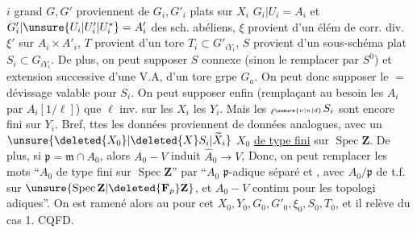  $i$ grand $G,G'$ proviennent de $G_i,G'_i$  plats sur $X_i$
$G_i|U_i=A_i$ et $G'_i|\unsure{U_i|U_i'|U_i^*}=A'_i$ des sch. abéliens,
$\xi$ provient d'un élém de corr. div. $\xi'$ sur $A_i\times A'_i$,
$T$ provient d'un tore $T_i\subset G'_{iY_i}$, $S$ provient d'un sous-schéma plat $S_i\subset G_{iY_i}$.
De plus,   on peut  supposer $S$ connexe  (sinon le remplacer par $S^0$) et
extension  successive d'une V.A, d'un tore     grpe $G_a$.
On peut donc supposer le $=$ dévissage valable pour $S_i$.
On peut supposer enfin (remplaçant au besoin les $A_i$ par  $A_i[1/\ell]$) que $\ell$ inv. sur les $X_i$  les $Y_i$.
Mais les $ {}_{\ell^{\unsure{\nu|n|d}}}S_i$ sont encore fini sur $Y_i$.
Bref, ttes les données proviennent de  données analogues, avec un $\unsure{\deleted{X_0}|\deleted{X}S_i|\widetilde X_i}$
$X_0$  \uline{de type fini} sur $\operatorname{Spec}\mathbf Z$.
De plus, si $\mathfrak p=\mathfrak m\cap A_0$, alors $A_0\mathbin{-}V$ induit $\widehat A_0\longrightarrow V$, 
Donc, on peut remplacer les mots ``$A_0$ de type fini sur $\operatorname{Spec}\mathbf Z$'' par ``$A_0$ $\mathfrak p$-adique séparé et , avec $A_0/\mathfrak p$ de t.f. sur $\unsure{\operatorname{Spec}\mathbf Z|\deleted{\mathbf F_p}\mathbf Z}$, et $A_0\mathbin{-}V$ continu pour les topologi adiques''.
On est ramené alors au  pour cet $X_0,Y_0,G_0,G'_0,\xi_0,S_0,T_0$, et il relève du cas 1.
\hfill CQFD.
